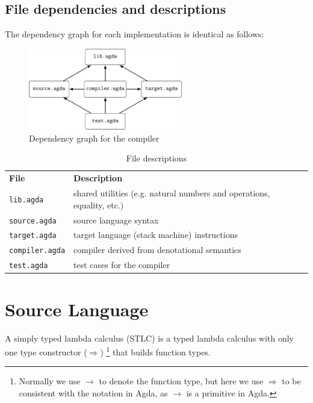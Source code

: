\documentclass[12pt,a4paper]{report}
\theoremstyle{definition}
\begin{document}
        \subsection{File dependencies and descriptions}
        The dependency graph for each implementation is identical as follows:
        \begin{figure}[H]
            \centering
            \includegraphics[width=0.6\textwidth]{dependencies.pdf}
            \caption{Dependency graph for the compiler}
            \label{fig: dependencies}
        \end{figure}

        \begin{table}[H]
            \centering
            \begin{tabular}{|l|l|l|}
                \hline
                \textbf{File} & \textbf{Description}\\
                \hhline{|=|=|}
                \texttt{lib.agda} & shared utilities (e.g. natural numbers and operations, equality, etc.) \\
                \hline
                \texttt{source.agda} & source language syntax \\
                \hline
                \texttt{target.agda} & target language (stack machine) instructions \\
                \hline
                \texttt{compiler.agda} & compiler derived from denotational semantics \\
                \hline
                \texttt{test.agda} & test cases for the compiler \\
                \hline
            \end{tabular}
            \caption{File descriptions}
            \label{tab: file_descriptions}
        \end{table}

    \section{Source Language}
    A simply typed lambda calculus (STLC) is a typed lambda calculus with only one type constructor ($\Rightarrow$) \footnote{Normally we use $\to$ to denote the function type, but here we use $\Rightarrow$ to be consistent with the notation in Agda, as $\to$ is a primitive in Agda.} that builds function types. 
    
\end{document}
